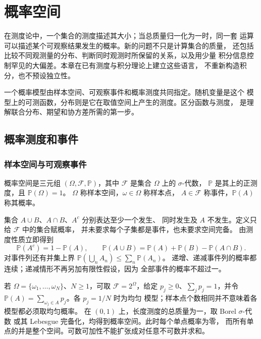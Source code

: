\chapter{概率空间}
\label{chap:probability-spaces}

在测度论中，一个集合的测度描述其大小；当总质量归一化为一时，同一套
运算可以描述某个可观察结果发生的概率。新的问题不只是计算集合的质量，
还包括比较不同观测量的分布、判断同时观测时所保留的关系，以及用少量
积分信息控制罕见的大偏差。本章在已有测度与积分理论上建立这些语言，
不重新构造积分，也不预设独立性。

一个概率模型由样本空间、可观察事件和概率测度共同指定。随机变量是这个
模型上的可测函数，分布则是它在取值空间上产生的测度。区分函数与测度，
是理解联合分布、期望和协方差所需的第一步。

\section{概率测度和事件}
\label{sec:probability-events}

\subsection{样本空间与可观察事件}

\begin{definition}\label{def:probability-space}
概率空间是三元组 \((\Omega,\mathcal F,\mathbb P)\)，其中
\(\mathcal F\) 是集合 \(\Omega\) 上的 \(\sigma\)-代数，
\(\mathbb P\) 是其上的正测度，且 \(\mathbb P(\Omega)=1\)。
\(\Omega\) 称样本空间，\(\omega\in\Omega\) 称样本点，
\(A\in\mathcal F\) 称事件，\(\mathbb P(A)\) 称其概率。
\end{definition}

集合 \(A\cup B\)、\(A\cap B\)、\(A^c\) 分别表达至少一个发生、
同时发生及 \(A\) 不发生。定义只给 \(\mathcal F\) 中的集合赋概率，
并未要求每个子集都是事件，也未要求空间完备。
由测度性质立即得到
\[
 \mathbb P(A^c)=1-\mathbb P(A),\qquad
 \mathbb P(A\cup B)=\mathbb P(A)+\mathbb P(B)-\mathbb P(A\cap B).
\]
对事件列还有并集上界
\(\mathbb P(\bigcup_n A_n)\le\sum_n\mathbb P(A_n)\)。
递增、递减事件列的概率都连续；递减情形不再另加有限性假设，因为
全部事件的概率不超过一。

\begin{example}
若 \(\Omega=\{\omega_1,\ldots,\omega_N\}\)、\(N\ge1\)，可取
\(\mathcal F=2^\Omega\)，给定 \(p_j\ge0\)、\(\sum_jp_j=1\)，并令
\(\mathbb P(A)=\sum_{\omega_j\in A}p_j\)。各 \(p_j=1/N\) 时为均匀
模型；样本点个数相同并不意味着各模型都必须取均匀概率。
在 \((0,1)\) 上，长度测度的总质量为一，取 Borel \(\sigma\)-代数
或其 Lebesgue 完备化，均得到概率空间。此时每个单点概率为零，
而所有单点的并是整个空间。可数可加性不能扩张成对任意不可数并求和。
\end{example}

